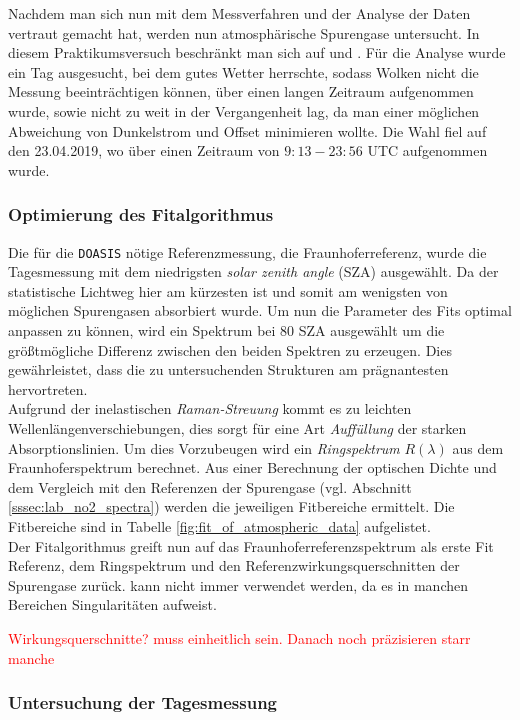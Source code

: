 \documentclass[12pt, a4paper, bibliography=totoc]{scrartcl}
\begin{document}
\begin{multicols}{2}
Nachdem man sich nun mit dem Messverfahren und der Analyse der Daten vertraut gemacht hat, werden nun atmosphärische Spurengase untersucht. In diesem Praktikumsversuch beschränkt man sich auf  und .
Für die Analyse wurde ein Tag ausgesucht, bei dem gutes Wetter herrschte, sodass Wolken nicht die Messung beeinträchtigen können, über einen langen Zeitraum aufgenommen wurde, sowie nicht zu weit in der Vergangenheit lag, da man einer möglichen Abweichung von Dunkelstrom und Offset minimieren wollte.
Die Wahl fiel auf den 23.04.2019, wo über einen Zeitraum von $9:13 - 23:56$ UTC aufgenommen wurde.

\subsubsection{Optimierung des Fitalgorithmus}\label{sssec:configure_fit}

Die für die \verb*+DOASIS+ nötige Referenzmessung, die Fraunhoferreferenz, wurde die Tagesmessung mit dem niedrigsten
\textit{solar zenith angle} (SZA) ausgewählt. 
Da der statistische Lichtweg hier am kürzesten ist und somit am wenigsten von möglichen Spurengasen absorbiert wurde.
Um nun die Parameter des Fits optimal anpassen zu können, wird ein Spektrum bei $80$ SZA ausgewählt um die größtmögliche Differenz zwischen den beiden Spektren zu erzeugen. 
Dies gewährleistet, dass die zu untersuchenden Strukturen am prägnantesten hervortreten. \\
Aufgrund der inelastischen \textit{Raman-Streuung} kommt es zu leichten Wellenlängenverschiebungen, dies sorgt für eine Art \textit{Auffüllung} der starken Absorptionslinien.
Um dies Vorzubeugen wird ein \textit{Ringspektrum} $R(\lambda)$ aus dem Fraunhoferspektrum berechnet.
Aus einer Berechnung der optischen Dichte und dem Vergleich mit den Referenzen der Spurengase (vgl. Abschnitt \ref{sssec:lab_no2_spectra}) werden die jeweiligen Fitbereiche ermittelt. 
Die Fitbereiche sind in Tabelle \ref{fig:fit_of_atmospheric_data} aufgelistet.\\
Der Fitalgorithmus greift nun auf das Fraunhoferreferenzspektrum als erste Fit Referenz, dem Ringspektrum und den Referenzwirkungsquerschnitten der Spurengase zurück. 
 kann nicht immer verwendet werden, da es in manchen Bereichen Singularitäten aufweist.

\textcolor{red}{Wirkungsquerschnitte? muss einheitlich sein. Danach noch präzisieren starr manche}

\subsubsection{Untersuchung der Tagesmessung}


\end{multicols}
\end{document}
